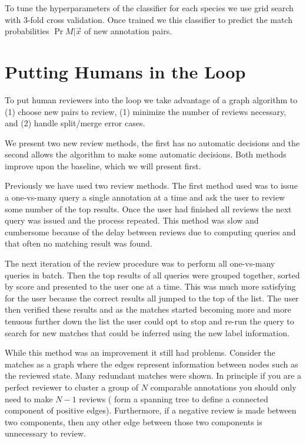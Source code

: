 To tune the hyperparameters of the classifier for each species we use grid
  search with $3$-fold cross validation.
Once trained we this classifier to predict the match probabilities $\Pr{M |
  \vec{x}}$ of new annotation pairs.

\section{Putting Humans in the Loop}

To put human reviewers into the loop we take advantage of a graph algorithm to 
(1) choose new pairs to review,
(1) minimize the number of reviews necessary, and
(2) handle split/merge error cases.

We present two new review methods, the first has no automatic decisions and
  the second allows the algorithm to make some automatic decisions.
Both methods improve upon the baseline, which we will present first.

Previously we have used two review methods.
The first method used was to issue a one-vs-many query a single annotation at
  a time and ask the user to review some number of the top results.
Once the user had finished all reviews the next query was issued and the
  process repeated.
This method was slow and cumbersome because of the delay between reviews due
  to computing queries and that often no matching result was found.

The next iteration of the review procedure was to perform all one-vs-many
  queries in batch.
Then the top results of all queries were grouped together, sorted by score and
  presented to the user one at a time.
This was much more satisfying for the user because the correct results all
  jumped to the top of the list.
The user then verified these results and as the matches started becoming more
  and more tenuous further down the list the user could opt to stop and re-run
  the query to search for new matches that could be inferred using the new label
  information.

While this method was an improvement it still had problems.
Consider the matches as a graph where the edges represent information between
  nodes such as the reviewed state.
Many redundant matches were shown.
In principle if you are a perfect reviewer to cluster a group of $N$
  comparable annotations you should only need to make $N-1$ reviews (\ie{} form
  a spanning tree to define a connected component of positive edges).
Furthermore, if a negative review is made between two components, then any
  other edge between those two components is unnecessary to review.

